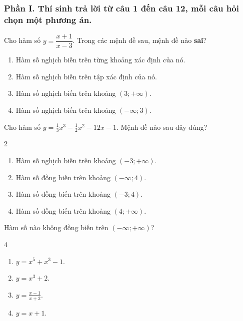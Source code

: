 \subsubsection*{Phần I. Thí sinh trả lời từ câu 1 đến câu 12, mỗi câu hỏi chọn một phương án.}
\setcounter{bt}{0}
\begin{baitap}
	Cho hàm số $y = \dfrac{x + 1}{x - 3}$. Trong các mệnh đề sau, mệnh đề nào \textbf{sai}?
	\begin{enumerate}[\quad \bf A.]
		\item Hàm số nghịch biến trên từng khoảng xác định của nó.
		\item Hàm số nghịch biến trên tập xác định của nó.
		\item Hàm số nghịch biến trên khoảng $(3; +\infty)$.
		\item Hàm số nghịch biến trên khoảng $(-\infty; 3)$.
	\end{enumerate}
\end{baitap}

\begin{baitap}
	Cho hàm số $y = \frac{1}{3}x^3 - \frac{1}{2}x^2 - 12x - 1$. Mệnh đề nào sau đây đúng?
	\begin{multicols}{2}
		\begin{enumerate}[\quad \bf A.]
		\item Hàm số nghịch biến trên khoảng $(-3; +\infty)$.
		\item Hàm số đồng biến trên khoảng $(-\infty; 4)$.
		\item Hàm số đồng biến trên khoảng $(-3; 4)$.
		\item Hàm số đồng biến trên khoảng $(4; +\infty)$.
	\end{enumerate}
	\end{multicols}
\end{baitap}

\begin{baitap}
	Hàm số nào không đồng biến trên $(-\infty; +\infty)$?
	\begin{multicols}{4}
		\begin{enumerate}[\quad \bf A.]
			\item $y = x^5 + x^3 - 1$.
			\item $y = x^3 + 2$.
			\item $y = \frac{x - 1}{x + 2}$.
			\item $y = x + 1$.
		\end{enumerate}
	\end{multicols}
\end{baitap}

